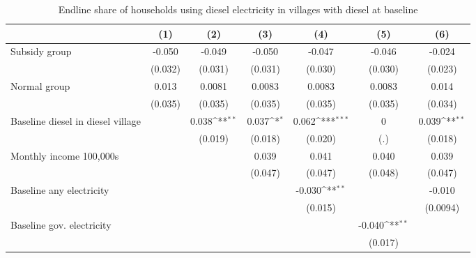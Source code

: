 \begin{table}[htbp]\centering
\def\sym#1{\ifmmode^{#1}\else\(^{#1}\)\fi}
\caption{Endline share of households using diesel electricity in villages with diesel at baseline}
\begin{tabular*}{1\hsize}{@{\hskip\tabcolsep\extracolsep\fill}l*{6}{c}}
\toprule
                &\multicolumn{1}{c}{(1)}         &\multicolumn{1}{c}{(2)}         &\multicolumn{1}{c}{(3)}         &\multicolumn{1}{c}{(4)}         &\multicolumn{1}{c}{(5)}         &\multicolumn{1}{c}{(6)}         \\
\midrule
Subsidy group   &   -0.050         &   -0.049         &   -0.050         &   -0.047         &   -0.046         &   -0.024         \\
                &  (0.032)         &  (0.031)         &  (0.031)         &  (0.030)         &  (0.030)         &  (0.023)         \\
Normal group    &    0.013         &   0.0081         &   0.0083         &   0.0083         &   0.0083         &    0.014         \\
                &  (0.035)         &  (0.035)         &  (0.035)         &  (0.035)         &  (0.035)         &  (0.034)         \\
Baseline diesel in diesel village&                  &    0.038\sym{**} &    0.037\sym{*}  &    0.062\sym{***}&        0         &    0.039\sym{**} \\
                &                  &  (0.019)         &  (0.018)         &  (0.020)         &      (.)         &  (0.018)         \\
Monthly income 100,000s&                  &                  &    0.039         &    0.041         &    0.040         &    0.039         \\
                &                  &                  &  (0.047)         &  (0.047)         &  (0.048)         &  (0.047)         \\
Baseline any electricity&                  &                  &                  &   -0.030\sym{**} &                  &   -0.010         \\
                &                  &                  &                  &  (0.015)         &                  & (0.0094)         \\
Baseline gov. electricity&                  &                  &                  &                  &   -0.040\sym{**} &                  \\
                &                  &                  &                  &                  &  (0.017)         &                  \\

\end{tabular*}
\end{table}
